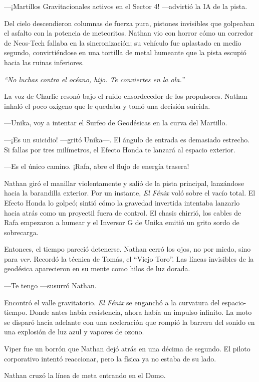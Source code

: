 \documentclass[11pt,twoside]{book}
\begin{document}
---¡Martillos Gravitacionales activos en el Sector 4! ---advirtió la IA de la pista.

Del cielo descendieron columnas de fuerza pura, pistones invisibles que golpeaban el asfalto con la potencia de meteoritos. Nathan vio con horror cómo un corredor de Neos-Tech fallaba en la sincronización; su vehículo fue aplastado en medio segundo, convirtiéndose en una tortilla de metal humeante que la pista escupió hacia las ruinas inferiores.

\textit{``No luchas contra el océano, hijo. Te conviertes en la ola.''}

La voz de Charlie resonó bajo el ruido ensordecedor de los propulsores. Nathan inhaló el poco oxígeno que le quedaba y tomó una decisión suicida.

---Unika, voy a intentar el Surfeo de Geodésicas en la curva del Martillo.

---¡Es un suicidio! ---gritó Unika---. El ángulo de entrada es demasiado estrecho. Si fallas por tres milímetros, el Efecto Honda te lanzará al espacio exterior.

---Es el único camino. ¡Rafa, abre el flujo de energía trasera!

Nathan giró el manillar violentamente y salió de la pista principal, lanzándose hacia la barandilla exterior. Por un instante, \textit{El Fénix} voló sobre el vacío total. El Efecto Honda lo golpeó; sintió cómo la gravedad invertida intentaba lanzarlo hacia atrás como un proyectil fuera de control. El chasis chirrió, los cables de Rafa empezaron a humear y el Inversor G de Unika emitió un grito sordo de sobrecarga.

Entonces, el tiempo pareció detenerse. Nathan cerró los ojos, no por miedo, sino para \textit{ver}. Recordó la técnica de Tomás, el ``Viejo Toro''. Las líneas invisibles de la geodésica aparecieron en su mente como hilos de luz dorada.

---Te tengo ---susurró Nathan.

Encontró el valle gravitatorio. \textit{El Fénix} se enganchó a la curvatura del espacio-tiempo. Donde antes había resistencia, ahora había un impulso infinito. La moto se disparó hacia adelante con una aceleración que rompió la barrera del sonido en una explosión de luz azul y vapores de ozono.

Viper fue un borrón que Nathan dejó atrás en una décima de segundo. El piloto corporativo intentó reaccionar, pero la física ya no estaba de su lado.

Nathan cruzó la línea de meta entrando en el Domo.
\end{document}
